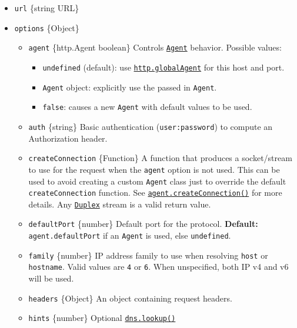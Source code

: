 \begin{itemize}
\tightlist
\item
  \texttt{url} \{string \textbar{} URL\}
\item
  \texttt{options} \{Object\}

  \begin{itemize}
  \tightlist
  \item
    \texttt{agent} \{http.Agent \textbar{} boolean\} Controls
    \hyperref[class-httpagent]{\texttt{Agent}} behavior. Possible
    values:

    \begin{itemize}
    \tightlist
    \item
      \texttt{undefined} (default): use
      \hyperref[httpglobalagent]{\texttt{http.globalAgent}} for this
      host and port.
    \item
      \texttt{Agent} object: explicitly use the passed in
      \texttt{Agent}.
    \item
      \texttt{false}: causes a new \texttt{Agent} with default values to
      be used.
    \end{itemize}
  \item
    \texttt{auth} \{string\} Basic authentication
    (\texttt{\textquotesingle{}user:password\textquotesingle{}}) to
    compute an Authorization header.
  \item
    \texttt{createConnection} \{Function\} A function that produces a
    socket/stream to use for the request when the \texttt{agent} option
    is not used. This can be used to avoid creating a custom
    \texttt{Agent} class just to override the default
    \texttt{createConnection} function. See
    \hyperref[agentcreateconnectionoptions-callback]{\texttt{agent.createConnection()}}
    for more details. Any
    \href{stream.md\#class-streamduplex}{\texttt{Duplex}} stream is a
    valid return value.
  \item
    \texttt{defaultPort} \{number\} Default port for the protocol.
    \textbf{Default:} \texttt{agent.defaultPort} if an \texttt{Agent} is
    used, else \texttt{undefined}.
  \item
    \texttt{family} \{number\} IP address family to use when resolving
    \texttt{host} or \texttt{hostname}. Valid values are \texttt{4} or
    \texttt{6}. When unspecified, both IP v4 and v6 will be used.
  \item
    \texttt{headers} \{Object\} An object containing request headers.
  \item
    \texttt{hints} \{number\} Optional
    \href{dns.md\#supported-getaddrinfo-flags}{\texttt{dns.lookup()}
}
\end{itemize}
\end{itemize}
